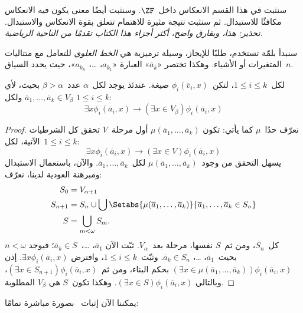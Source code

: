 \documentclass[../../../include/open-logic-section]{subfiles}
\begin{document}

سنثبت في هذا القسم الانعكاس داخل~$\ZF$. وسنثبت أيضًا معنى يكون فيه
الانعكاس مكافئًا للاستبدال. ثم سنثبت نتيجة مثيرة للاهتمام تتعلق بقوة
الانعكاس والاستبدال. \emph{تحذير: هذا، وبفارق واضح، أكثر أجزاء هذا
الكتاب تقدمًا من الناحية الرياضية.}

سنبدأ بلمّة تستخدم، طلبًا للإيجاز، وسيلة ترميزية هي
\emph{الخط العلوي} للتعامل مع متتاليات المتغيرات أو الأشياء. وهكذا
تختصر «$\overline{a}_k$» العبارة «$a_{k_1}$، \dots، $a_{k_n}$»،
حيث يحدد السياق~$n$.

\begin{lem}
لكل~$1 \leq i \leq k$، لتكن~$\phi_i(\overline{v}_i, x)$ صيغة. عندئذ
يوجد لكل~$\alpha$ عدد~$\beta > \alpha$ بحيث، لأي
$\overline{a}_1, \ldots, \overline{a}_k \in V_\beta$ ولكل
$1 \leq i \leq k$:
\[
	\exists x\phi_i(\overline{a}_i, x) \rightarrow (\exists x \in V_\beta) \phi_i(\overline{a}_i, x)
\]
\end{lem}

\begin{proof}
نعرّف حدًا~$\mu$ كما يأتي: تكون
$\mu(\overline{a}_1, \ldots, \overline{a}_k)$ أول مرحلة~$V$ تحقق كل
الشرطيات الآتية، لكل~$1 \leq i \leq k$:
\[
\exists x\phi_i(\overline{a}_i, x) \rightarrow (\exists x \in V) \phi_i(\overline{a}_i, x)
\]
يسهل التحقق من وجود~$\mu(\overline{a}_1, \ldots,
\overline{a}_k)$ لكل~$\overline{a}_1, \ldots, \overline{a}_k$.
والآن، باستعمال الاستبدال ومبرهنة العودية لدينا، نعرّف:
\begin{align*}
	S_0 & = V_{\alpha+1}\\
	S_{n+1} & = S_n \cup \bigcup
	\Setabs{\mu(\overline{a}_1, \ldots, \overline{a}_k)}
	{\overline{a}_1, \ldots, \overline{a}_k \in S_n} \\
	S &= \bigcup_{m < \omega} S_m.
\end{align*}
كل~$S_n$، ومن ثم~$S$ نفسها، مرحلة بعد~$V_\alpha$. ثبّت الآن
$\overline{a}_1$، \dots،~$\overline{a}_k \in S$؛ فيوجد
$n < \omega$ بحيث~$\overline{a}_1$، \dots،
$\overline{a}_k \in S_n$. وثبّت~$1 \leq i \leq k$، وافترض
$\exists x\phi_i(\overline{a}_i,x)$. إذن
$(\exists x \in \mu(\overline{a}_1,
\ldots, \overline{a}_k))\phi_i(\overline{a}_i, x)$ بحكم البناء، ومن
ثم~$(\exists x \in S_{n+1})\phi_i(\overline{a}_i, x)$، وبالتالي
$(\exists x \in S)\phi_i(\overline{a}_i, x)$. وهكذا تكون~$S$ هي
$V_\beta$ المطلوبة.
\end{proof}
\noindent
يمكننا الآن إثبات~
بصورة مباشرة تمامًا:
\end{document}
